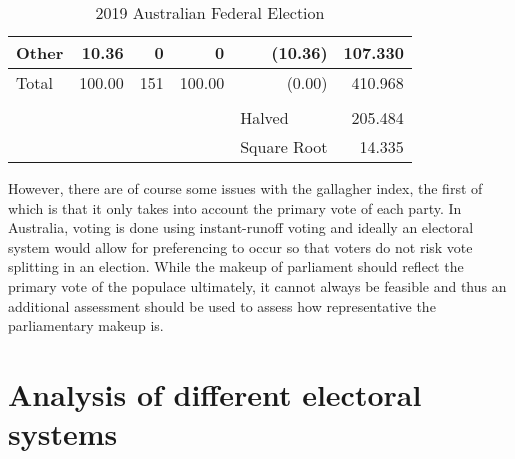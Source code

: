 \documentclass{report}
\begin{document}
\begin{table}[h]
\begin{tabular}{lrrrrr}
  Other                              & 10.36                                    & 0                                      & 0                                        & (10.36)                                 & 107.330                                                                                   \\
  \hline Total                              & 100.00                                   & 151                                    & 100.00                                   & (0.00)                                  & 410.968                                                                                   \\ \hline
                                     & \multicolumn{1}{l}{}                     & \multicolumn{1}{l}{}                   & \multicolumn{1}{l}{}                     & \multicolumn{1}{l}{}                    & \multicolumn{1}{l}{}                                                                      \\ \cline{6-6}
                                     & \multicolumn{1}{l}{}                     & \multicolumn{1}{l}{}                   & \multicolumn{1}{l}{}                     & \multicolumn{1}{l|}{Halved}             & \multicolumn{1}{r|}{205.484}                                                              \\ \cline{6-6}
                                     & \multicolumn{1}{l}{}                     & \multicolumn{1}{l}{}                   & \multicolumn{1}{l}{}                     & \multicolumn{1}{l|}{Square Root}        & \multicolumn{1}{r|}{14.335}                                                               \\ \cline{6-6}
  \end{tabular}
  \caption{2019 Australian Federal Election}
  \label{tab:2019Gallagher}
  \end{table}

  However, there are of course some issues with the gallagher index, the first of which is that it only takes into account the primary vote of each party. In Australia, voting is done using instant-runoff voting and ideally an electoral system would allow for preferencing to occur so that voters do not risk vote splitting in an election. While the makeup of parliament should reflect the primary vote of the populace ultimately, it cannot always be feasible and thus an additional assessment should be used to assess how representative the parliamentary makeup is.

  \chapter{Analysis of different electoral systems}


  \newpage
  
  
\end{document}
